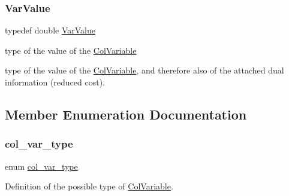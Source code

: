\subsubsection{\texorpdfstring{Var\+Value}{VarValue}}
{\footnotesize\ttfamily typedef double \mbox{\hyperlink{class_s_m_spp__di__unipi__it_1_1_col_variable_a5f7c601f4a24317327fbd91b9c7cd951}{Var\+Value}}}



type of the value of the \mbox{\hyperlink{class_s_m_spp__di__unipi__it_1_1_col_variable}{Col\+Variable}} 

type of the value of the \mbox{\hyperlink{class_s_m_spp__di__unipi__it_1_1_col_variable}{Col\+Variable}}, and therefore also of the attached dual information (reduced cost). 

\subsection{Member Enumeration Documentation}
\mbox{\label{class_s_m_spp__di__unipi__it_1_1_col_variable_ae6a9c27f20ec8030a1aef0c5b655c4e1}} 
\subsubsection{\texorpdfstring{col\+\_\+var\+\_\+type}{col\_var\_type}}
{\footnotesize\ttfamily enum \mbox{\hyperlink{class_s_m_spp__di__unipi__it_1_1_col_variable_ae6a9c27f20ec8030a1aef0c5b655c4e1}{col\+\_\+var\+\_\+type}}}



Definition of the possible type of \mbox{\hyperlink{class_s_m_spp__di__unipi__it_1_1_col_variable}{Col\+Variable}}. 

